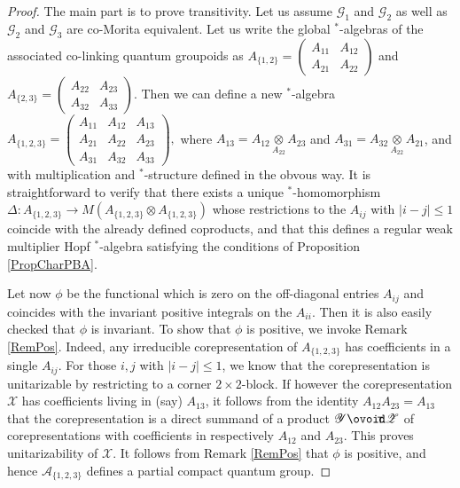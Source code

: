 \documentclass[10pt]{article}
\newcommand{\Circt}{{\mathop{\ooalign{$\ovoid$\cr\hidewidth\raise-.05ex\hbox{$\scriptstyle\mathsf T\mkern3.5mu$}\cr}}}} %
\theoremstyle{definition}
\numberwithin{equation}{section}
\begin{document}
\begin{proof} The main part is to prove transitivity.  Let us assume $\mathscr{G}_1$ and $\mathscr{G}_2$ as well as $\mathscr{G}_2$ and $\mathscr{G}_3$ are co-Morita equivalent. Let us write the global $^*$-algebras of the associated co-linking quantum groupoids as $A_{\{1,2\}} = \begin{pmatrix} A_{11} & A_{12} \\ A_{21} & A_{22} \end{pmatrix}$ and $A_{\{2,3\}} = \begin{pmatrix} A_{22} & A_{23} \\ A_{32} & A_{33}\end{pmatrix}$. Then we can define a new $^*$-algebra $A_{\{1,2,3\}}= \begin{pmatrix} A_{11} & A_{12} &   A_{13} \\ A_{21} & A_{22} & A_{23} \\ A_{31} & A_{32} & A_{33} \end{pmatrix},$ where $A_{13} = A_{12}\underset{A_{22}}{\otimes } A_{23}$ and $A_{31} = A_{32}\underset{A_{22}}{\otimes} A_{21}$, and with multiplication and $^*$-structure defined in the obvous way. It is straightforward to verify that there exists a unique $^*$-homomorphism $\Delta: A_{\{1,2,3\}} \rightarrow M(A_{\{1,2,3\}}\otimes A_{\{1,2,3\}})$ whose restrictions to the $A_{ij}$ with $|i-j|\leq 1$ coincide with the already defined coproducts, and that this defines a regular weak multiplier Hopf $^*$-algebra satisfying the conditions of Proposition \ref{PropCharPBA}. 

Let now $\phi$ be the functional which is zero on the off-diagonal entries $A_{ij}$ and coincides with the invariant positive integrals on the $A_{ii}$. Then it is also easily checked that $\phi$ is invariant. To show that $\phi$ is positive, we invoke Remark \ref{RemPos}. Indeed, any irreducible corepresentation of $A_{\{1,2,3\}}$ has coefficients in a single $A_{ij}$. For those $i,j$ with $|i-j|\leq 1$, we know that the corepresentation is unitarizable by restricting to a corner $2\times 2$-block. If however the corepresentation $\mathscr{X}$ has coefficients living in (say) $A_{13}$, it follows from the identity $A_{12}A_{23}=A_{13}$ that the corepresentation is a direct summand of a product $\mathscr{Y}\Circt \mathscr{Z}$ of corepresentations with coefficients in respectively $A_{12}$ and $A_{23}$. This proves unitarizability of $\mathscr{X}$. It follows from Remark \ref{RemPos} that $\phi$ is positive, and hence $\mathscr{A}_{\{1,2,3\}}$ defines a partial compact quantum group.  


\end{proof}
\end{document}

